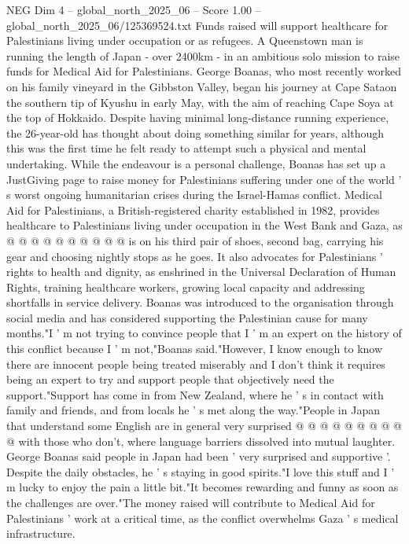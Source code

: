 \begin{textsample}{NEG Dim 4 – global\_north\_2025\_06 – Score 1.00 – global\_north\_2025\_06/125369524.txt}  \label{ex:f4_neg_064}
Funds raised will support healthcare for Palestinians living under occupation or as refugees.
A Queenstown man is running the length of Japan - over 2400km - in an ambitious solo mission to raise funds for Medical Aid for Palestinians.
George Boanas, who most recently worked on his family vineyard in the Gibbston Valley, began his journey at Cape Sataon the southern tip of Kyushu in early May, with the aim of reaching Cape Soya at the top of Hokkaido.
Despite having minimal long-distance running experience, the 26-year-old has thought about doing something similar for years, although this was the first time he felt ready to attempt such a physical and mental undertaking.
While the endeavour is a personal challenge, Boanas has set up a JustGiving page to raise money for Palestinians suffering under one of the world ' s worst ongoing humanitarian crises during the Israel-Hamas conflict.
Medical Aid for Palestinians, a British-registered charity established in 1982, provides healthcare to Palestinians living under occupation in the West Bank and Gaza, as @ @ @ @ @ @ @ @ @ @ is on his third pair of shoes, second bag, carrying his gear and choosing nightly stops as he goes.
It also advocates for Palestinians ' rights to health and dignity, as enshrined in the Universal Declaration of Human Rights, training healthcare workers, growing local capacity and addressing shortfalls in service delivery.
Boanas was introduced to the organisation through social media and has considered supporting the Palestinian cause for many months."I ' m not trying to convince people that I ' m an expert on the history of this conflict because I ' m not,"Boanas said."However, I know enough to know there are innocent people being treated miserably and I don't think it requires being an expert to try and support people that objectively need the support."Support has come in from New Zealand, where he ' s in contact with family and friends, and from locals he ' s met along the way."People in Japan that understand some English are in general very surprised @ @ @ @ @ @ @ @ @ @ with those who don't, where language barriers dissolved into mutual laughter.
George Boanas said people in Japan had been ' very surprised and supportive '.
Despite the daily obstacles, he ' s staying in good spirits."I love this stuff and I ' m lucky to enjoy the pain a little bit."It becomes rewarding and funny as soon as the challenges are over."The money raised will contribute to Medical Aid for Palestinians ' work at a critical time, as the conflict overwhelms Gaza ' s medical infrastructure.

\end{textsample}
